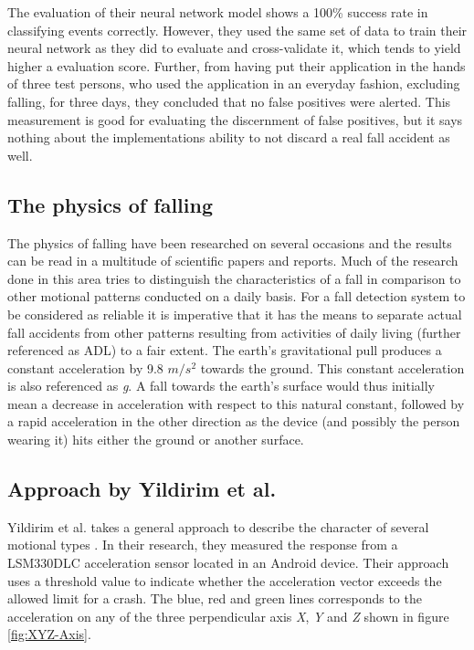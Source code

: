\documentclass[12pt, a4paper, onecolumn]{article}
\begin{document}
	The evaluation of their neural network model shows a 100\% success rate in classifying events correctly. However, they used the same set of data to train their neural network as they did to evaluate and cross-validate it, which tends to yield higher a evaluation score. Further, from having put their application in the hands of three test persons, who used the application in an everyday fashion, excluding falling, for three days, they concluded that no false positives were alerted. This measurement is good for evaluating the discernment of false positives, but it says nothing about the implementations ability to not discard a real fall accident as well. 
	
	\subsection{The physics of falling}
	The physics of falling have been researched on several occasions and the results can be read in a multitude of scientific papers and reports. Much of the research done in this area tries to distinguish the characteristics of a fall in comparison to other motional patterns conducted on a daily basis. For a fall detection system to be considered as reliable it is imperative that it has the means to separate actual fall accidents from other patterns resulting from activities of daily living (further referenced as ADL) to a fair extent. The earth's gravitational pull produces a constant acceleration by 9.8 $m/s^{2}$ towards the ground. This constant acceleration is also referenced as \textit{g}. A fall towards the earth's surface would thus initially mean a decrease in acceleration with respect to this natural constant, followed by a rapid acceleration in the other direction as the device (and possibly the person wearing it) hits either the ground or another surface.
	
	\subsection{Approach by Yildirim et al.}
	Yildirim et al. takes a general approach to describe the character of several motional types \cite{int_journ}. In their research, they measured the response from a LSM330DLC acceleration sensor located in an Android device. Their approach uses a threshold value to indicate whether the acceleration vector exceeds the allowed limit for a crash. The blue, red and green lines corresponds to the acceleration on any of the three perpendicular axis \textit{X}, \textit{Y} and \textit{Z} shown in figure \ref{fig:XYZ-Axis}.
	
\end{document}
